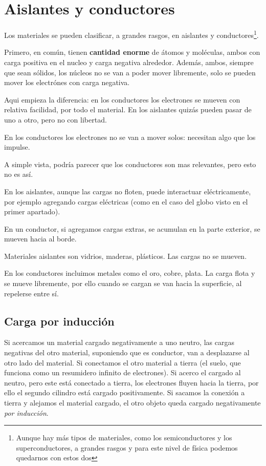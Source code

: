 \section{Aislantes y conductores}

Los materiales se pueden clasificar,
a grandes rasgos,
en aislantes y conductores\footnote{Aunque hay más tipos de materiales, como los semiconductores y los superconductores, a grandes rasgos y para este nivel de física podemos quedarnos con estos dos}.

Primero, en común,
tienen \textbf{cantidad enorme} de átomos y moléculas,
ambos con carga positiva en el nucleo y carga negativa alrededor.
Además,
ambos,
siempre que sean sólidos,
los núcleos no se van a poder mover libremente,
solo se pueden mover los electrónes con carga negativa.

Aqui empieza la diferencia:
en los conductores los electrones se mueven con relativa facilidad,
por todo el material.
En los aislantes quizás pueden pasar de uno a otro,
pero no con libertad.

En los conductores los electrones no se van a mover solos:
necesitan algo que los impulse.

A simple vista,
podría parecer que los conductores son mas relevantes,
pero esto no es así.

En los aislantes,
aunque las cargas no floten,
puede interactuar eléctricamente,
por ejemplo agregando cargas eléctricas
(como en el caso del globo visto en el primer apartado).

En un conductor, si agregamos cargas extras, se acumulan en la parte exterior,
se mueven hacia al borde.

Materiales aislantes son vidrios, maderas, plásticos.
Las cargas no se mueven.

En los conductores incluimos metales como el oro, cobre, plata.
La carga flota y se mueve libremente,
por ello cuando se cargan se van hacia la superficie,
al repelerse entre sí.

\subsection{Carga por inducción}

Si acercamos un material cargado negativamente a uno neutro,
las cargas negativas del otro material, suponiendo que es conductor,
van a desplazarse al otro lado del material.
Si conectamos el otro material a tierra
(el suelo, que funciona como un resumidero infinito de electrones).
Si acerco el cargado al neutro,
pero este está conectado a tierra,
los electrones fluyen hacia la tierra,
por ello el segundo cilindro está cargado positivamente.
Si sacamos la conexión a tierra y alejamos el material cargado,
el otro objeto queda cargado negativamente \textit{por inducción}.